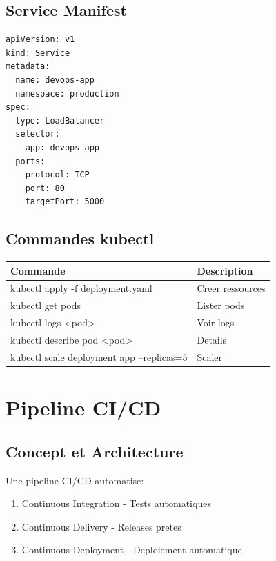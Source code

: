 \documentclass[12pt,a4paper]{report}
\begin{document}
\section{Service Manifest}

\begin{lstlisting}
apiVersion: v1
kind: Service
metadata:
  name: devops-app
  namespace: production
spec:
  type: LoadBalancer
  selector:
    app: devops-app
  ports:
  - protocol: TCP
    port: 80
    targetPort: 5000
\end{lstlisting}

\section{Commandes kubectl}

\begin{table}[H]
\centering
\begin{tabularx}{\linewidth}{|l|X|}
\hline
\textbf{Commande} & \textbf{Description} \\
\hline
kubectl apply -f deployment.yaml & Creer ressources \\
kubectl get pods & Lister pods \\
kubectl logs <pod> & Voir logs \\
kubectl describe pod <pod> & Details \\
kubectl scale deployment app --replicas=5 & Scaler \\
\hline
\end{tabularx}
\end{table}

\newpage

\chapter{Pipeline CI/CD}

\section{Concept et Architecture}

Une pipeline CI/CD automatise:
\begin{enumerate}
    \item Continuous Integration - Tests automatiques
    \item Continuous Delivery - Releases pretes
    \item Continuous Deployment - Deploiement automatique
\end{enumerate}
\end{document}
